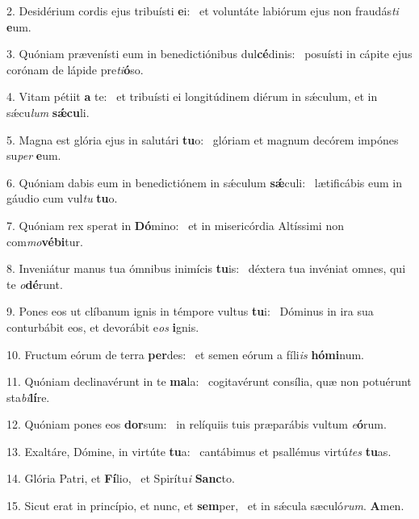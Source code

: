 2. Desidérium cordis ejus tribuísti \textbf{e}i: \ast\  et voluntáte labiórum ejus non fraudás\textit{ti} \textbf{e}um.\

3. Quóniam prævenísti eum in benedictiónibus dul\textbf{cé}dinis: \ast\  posuísti in cápite ejus corónam de lápide pre\textit{ti}\textbf{ó}so.\

4. Vitam pétiit \textbf{a} te: \ast\  et tribuísti ei longitúdinem diérum in sǽculum, et in sǽcu\textit{lum} \textbf{sǽ}\textbf{cu}li.\

5. Magna est glória ejus in salutári \textbf{tu}o: \ast\  glóriam et magnum decórem impónes su\textit{per} \textbf{e}um.\

6. Quóniam dabis eum in benedictiónem in sǽculum \textbf{sǽ}culi: \ast\  lætificábis eum in gáudio cum vul\textit{tu} \textbf{tu}o.\

7. Quóniam rex sperat in \textbf{Dó}mino: \ast\  et in misericórdia Altíssimi non com\textit{mo}\textbf{vé}\textbf{bi}tur.\

8. Inveniátur manus tua ómnibus inimícis \textbf{tu}is: \ast\  déxtera tua invéniat omnes, qui te \textit{o}\textbf{dé}runt.\

9. Pones eos ut clíbanum ignis in témpore vultus \textbf{tu}i: \ast\  Dóminus in ira sua conturbábit eos, et devorábit e\textit{os} \textbf{i}gnis.\

10. Fructum eórum de terra \textbf{per}des: \ast\  et semen eórum a fíli\textit{is} \textbf{hó}\textbf{mi}num.\

11. Quóniam declinavérunt in te \textbf{ma}la: \ast\  cogitavérunt consília, quæ non potuérunt sta\textit{bi}\textbf{lí}re.\

12. Quóniam pones eos \textbf{dor}sum: \ast\  in relíquiis tuis præparábis vultum \textit{e}\textbf{ó}rum.\

13. Exaltáre, Dómine, in virtúte \textbf{tu}a: \ast\  cantábimus et psallémus virtú\textit{tes} \textbf{tu}as.\

14. Glória Patri, et \textbf{Fí}lio, \ast\  et Spirítu\textit{i} \textbf{Sanc}to.\

15. Sicut erat in princípio, et nunc, et \textbf{sem}per, \ast\  et in sǽcula sæculó\textit{rum}. \textbf{A}men.\

